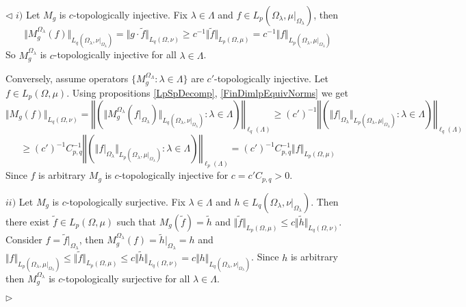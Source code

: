 \documentclass[12pt]{article}
\newenvironment{proof}{\par $\triangleleft$}{$\triangleright$}
\begin{document}
\begin{proof}
$i)$ Let $M_g$ is $c$-topologically injective. Fix $\lambda\in\Lambda$ and $f\in L_p(\Omega_\lambda,\mu|_{\Omega_\lambda})$, then
$$
\Vert M_g^{\Omega_\lambda}(f)\Vert_{L_q(\Omega_\lambda,\nu|_{\Omega_\lambda})}
=\Vert g\cdot \widetilde{f}\Vert_{L_q(\Omega,\nu)}
\geq c^{-1}\Vert\widetilde{f}\Vert_{L_p(\Omega,\mu)}
=c^{-1}\Vert f\Vert_{L_p(\Omega_\lambda,\mu|_{\Omega_\lambda})}
$$
So $M_g^{\Omega_\lambda}$ is $c$-topologically injective for all $\lambda\in\Lambda$.

Conversely, assume operators $\{M_g^{\Omega_\Lambda}:\lambda\in\Lambda\}$ are $c'$-topologically injective. Let $f\in L_p(\Omega,\mu)$. Using propositions \ref{LpSpDecomp}, \ref{FinDimlpEquivNorms} we get
$$
\Vert M_g(f)\Vert_{L_q(\Omega,\nu)}
=\left\Vert\left(\Vert M_g^{\Omega_\lambda}(f|_{\Omega_\lambda})\Vert_{L_q(\Omega_\lambda,\nu|_{\Omega_\lambda})}:\lambda\in\Lambda\right)\right\Vert_{\ell_q(\Lambda)}
\geq (c')^{-1}\left\Vert\left(\Vert f|_{\Omega_\lambda}\Vert_{L_p(\Omega_\lambda,\mu|_{\Omega_\lambda})}:\lambda\in\Lambda\right)\right\Vert_{\ell_q(\Lambda)}
$$
$$
\geq (c')^{-1} C_{p,q}^{-1}\left\Vert\left(\Vert f|_{\Omega_\lambda}\Vert_{L_p(\Omega_\lambda,\mu|_{\Omega_\lambda})}:\lambda\in\Lambda\right)\right\Vert_{\ell_p(\Lambda)}
=(c')^{-1}C_{p,q}^{-1}\Vert f\Vert_{L_p(\Omega,\mu)}
$$
Since $f$ is arbitrary $M_g$ is $c$-topologically injective for $c=c'C_{p,q}>0$.

$ii)$ Let $M_g$ is $c$-topologically surjective. Fix $\lambda\in\Lambda$ and $h\in L_q(\Omega_\lambda,\nu|_{\Omega_\lambda})$. Then there exist $\widetilde{f}\in L_p(\Omega,\mu)$ such that $M_g(\widetilde{f})=\widetilde{h}$ and $\Vert \widetilde{f}\Vert_{L_p(\Omega,\mu)}\leq c\Vert \widetilde{h}\Vert_{L_q(\Omega,\nu)}$. Consider $f=\widetilde{f}|_{\Omega_\lambda}$, then $M_g^{\Omega_\lambda}(f)=\widetilde{h}|_{\Omega_\lambda}=h$ and $\Vert f\Vert_{L_p(\Omega_\lambda,\mu|_{\Omega_\lambda})}\leq \Vert \widetilde{f}\Vert_{L_p(\Omega,\mu)}\leq c\Vert\widetilde{h}\Vert_{L_q(\Omega,\nu)}=c\Vert h\Vert_{L_q(\Omega_\lambda,\nu|_{\Omega_\lambda})}$. Since $h$  is arbitrary then $M_g^{\Omega_\lambda}$ is $c$-topologically surjective for all $\lambda\in\Lambda$.


\end{proof}
\end{document}
